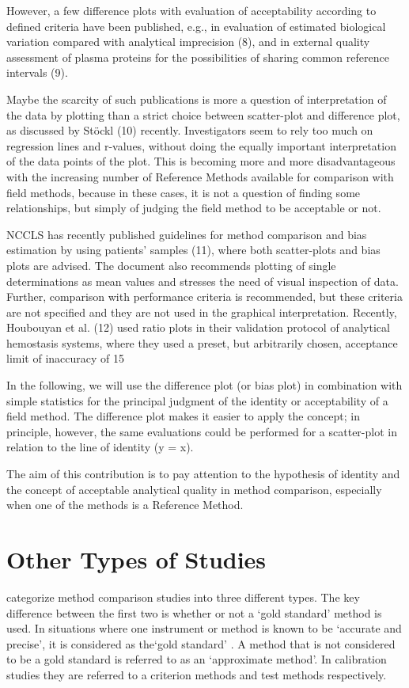 \documentclass[12pt, a4paper]{report}
\theoremstyle{plain}
\theoremstyle{definition}
\theoremstyle{remark}
\begin{document}
However, a few difference plots with evaluation of acceptability according to defined criteria have been published, e.g., in evaluation of estimated biological variation compared with analytical imprecision (8), and in external quality assessment of plasma proteins for the possibilities of sharing common reference intervals (9).

Maybe the scarcity of such publications is more a question of interpretation of the data by plotting than a strict choice between scatter-plot and difference plot, as discussed by Stöckl (10) recently. Investigators seem to rely too much on regression lines and r-values, without doing the equally important interpretation of the data points of the plot. This is becoming more and more disadvantageous with the increasing number of Reference Methods available for comparison with field methods, because in these cases, it is not a question of finding some relationships, but simply of judging the field method to be acceptable or not.

NCCLS has recently published guidelines for method comparison and bias estimation by using patients’ samples (11), where both scatter-plots and bias plots are advised. The document also recommends plotting of single determinations as mean values and stresses the need of visual inspection of data. Further, comparison with performance criteria is recommended, but these criteria are not specified and they are not used in the graphical interpretation. Recently, Houbouyan et al. (12) used ratio plots in their validation protocol of analytical hemostasis systems, where they used a preset, but arbitrarily chosen, acceptance limit of inaccuracy of 15%

In the following, we will use the difference plot (or bias plot) in combination with simple statistics for the principal judgment of the identity or acceptability of a field method. The difference plot makes it easier to apply the concept; in principle, however, the same evaluations could be performed for a scatter-plot in relation to the line of identity (y = x).

The aim of this contribution is to pay attention to the hypothesis of identity and the concept of acceptable analytical quality in method comparison, especially when one of the methods is a Reference Method.
	
	



\section{Other Types of Studies}
\citet{lewis} categorize method comparison studies into three
different types.  The key difference between the first two is
whether or not a `gold standard' method is used. In situations
where one instrument or method is known to be `accurate and
precise', it is considered as the`gold standard' \citep{lewis}. A
method that is not considered to be a gold standard is referred to
as an `approximate method'. In calibration studies they are
referred to a criterion methods and test methods respectively.
\end{document}
